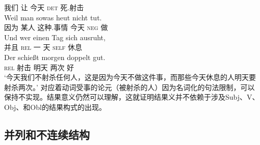 \begin{exe}
\begin{xlist}[iv.]
\begin{exe}
\begin{xlist}[iv.]
我们  让    今天 \textsc{det} 死.射击\\
\gll  Weil  man sowas heut nicht tut.\\
      因为 某人 这种.事情 今天 \textsc{neg} 做\\
\gll Und wer einen Tag sich ausruht,\\
     并且 \textsc{rel} 一 天 \textsc{self} 休息\\
\gll Der schießt morgen doppelt gut.\footnotemark\\
\textsc{rel} 射击 明天 两次 好\\
\glt `今天我们不射杀任何人，这是因为今天不做这件事，而那些今天休息的人明天要射杀两次。'
\zl
对应着动词受事的论元（被射杀的人）因为名词化的句法限制，可以保持不实现。结果意义仍然可以理解，这就证明结果义并不依赖于涉及Subj、V、Obj、和Obl的结果构式的出现。

\subsection{并列和不连续结构}
\label{Abschnitt-Koordination}
\label{Abschnitt-Koordination-diskont}\label{sec-coordination-cg}


\end{xlist}
\end{exe}
\end{xlist}
\end{exe}
